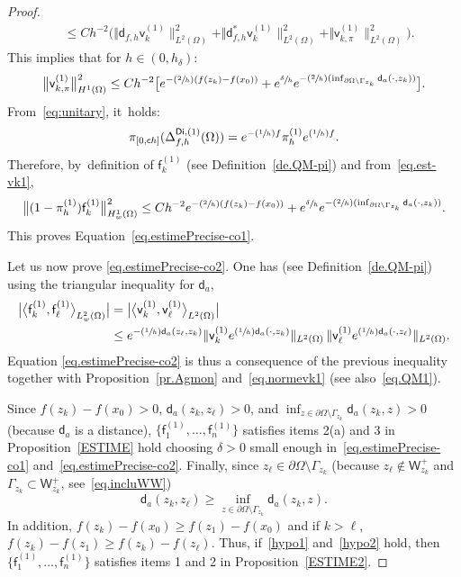 \documentclass[JEP,XML,SOM,Unicode,NoEqCountersInSection,NoFloatCountersInSection,published]{cedram}
\newcommand{\Psfrac}[2]{(\sfrac{#1}{#2})}
\let\lp\langle
\let\rp\rangle
\theoremstyle{plain}
\theoremstyle{definition}
\begin{document}
\begin{proof}
\begin{align}
\label{eq.est-QQ}
& \le Ch^{-2}\bigl(\Vert \mathsf d_{f,h} \mathsf v_k^{(1)} \|_{ L^{2} (\Omega)}^2 + \Vert \mathsf d^*_{f,h} \mathsf v_k^{(1)} \|_{ L^{2} (\Omega)}^2 + \Vert \mathsf v_{k,\pi}^{(1)} \|_{ L^{2} (\Omega)}^2\bigr).
\end{align}
This implies that for $h\in (0,h_\delta)$:
\begin{equation}\label{eq.est-vk1}
\big \| \mathsf v_{k,\pi}^{(1)} \big \|^{2}_{ H^1 (\Omega)}\le C h^{-2} \big[ e^{-\Psfrac 2h(f(z_k)-f(x_0))}+ e^{\sfrac{ \delta }{h}}e^{-\Psfrac 2h(\inf_{ \partial \Omega \setminus \Gamma_{z_k}} \mathsf d_a(\cdot,z_k))}\big].
\end{equation}
From~\eqref{eq:unitary}, it~holds:
\[
\pi_{[0,\mathsf ch]} (\Delta_{f,h}^{\mathsf{Di},(1)} (\Omega))=
e^{-\Psfrac 1hf}\pi_h^{(1)}e^{\Psfrac 1 h f}.
\]
Therefore, by~definition of $ \mathsf f_k^{(1)}$ (see Definition~\ref{de.QM-pi}) and from~\eqref{eq.est-vk1},
\[
\big \Vert (1-\pi_h^{(1)}) \mathsf f_k^{(1)} \big \|^{2}_{ H^{1}_w (\Omega)} \le Ch^{-2}e^{-\Psfrac 2h(f(z_k)-f(x_0))}+ e^{\sfrac{ \delta }{h}} e^{-\Psfrac 2h(\inf_{\partial \Omega \setminus \Gamma_{z_k}} \mathsf d_a(\cdot,z_k))}.
\]
This proves Equation~\eqref{eq.estimePrecise-co1}.

Let us now prove \eqref{eq.estimePrecise-co2}. One has (see Definition~\ref{de.QM-pi}) using the triangular inequality for $\mathsf d_a$,
\[
\begin{aligned}
\bigl\vert \big\lp\mathsf f_k^{(1)}, \mathsf
f_\ell^{(1)}\big\rp_{L^2_w(\Omega)}\bigr|&=\bigl|\big\lp\mathsf v_k^{(1)},
\mathsf v_\ell^{(1)}\big\rp_{L^2(\Omega)}\bigr|\\
&\le e^{-\Psfrac 1h \mathsf d_a(z_\ell,z_k)} \Vert \mathsf
v_k^{(1)}e^{\Psfrac 1h \mathsf d_a(\cdot,z_k)} \Vert_{L^2(\Omega)}\,
\Vert \mathsf v_\ell^{(1)}e^{\Psfrac 1h \mathsf d_a(\cdot,z_\ell)}
\Vert_{L^2(\Omega)}.
\end{aligned}
\]
Equation \eqref{eq.estimePrecise-co2} is thus a consequence of the previous inequality together with Proposition~\ref{pr.Agmon} and~\eqref{eq.normevk1} (see also~\eqref{eq.QM1}).

Since $f(z_k)-f(x_0)>0$, $\mathsf d_a(z_k,z_\ell)>0$, and $ \inf_{z\in \partial \Omega \setminus \Gamma_{z_k}} \mathsf d_a(z_k,z)>0$ (because $\mathsf d_a$ is a distance), $\{\mathsf f_1^{(1)}, \ldots, \mathsf f_n^{(1)}\} $ satisfies items 2(a) and 3 in Proposition~\ref{ESTIME} hold choosing $\delta>0$ small enough in~\eqref{eq.estimePrecise-co1} and~\eqref{eq.estimePrecise-co2}. Finally, since $z_\ell \in \partial \Omega \setminus \Gamma_{z_k}$ (because $z_\ell\notin \mathsf W_{z_k}^+$ and $ \Gamma_{z_k}\subset \mathsf W_{z_k}^+ $, see~\eqref{eq.incluWW})
\[
\mathsf d_a(z_k,z_\ell)\ge \inf_{z\in \partial \Omega \setminus \Gamma_{z_k}} \mathsf d_a(z_k,z).
\]
In addition, $f(z_k)-f(x_0)\!\ge\! f(z_1)-f(x_0)$ and if $k\!>\!\ell$, \hbox{$f(z_k)-f(z_1)\!\ge\! f(z_k)-f(z_\ell)$}.
Thus, if~\eqref{hypo1} and~\eqref{hypo2} hold, then $\{\mathsf f_1^{(1)}, \ldots, \mathsf f_n^{(1)}\} $ satisfies items 1 and 2 in Proposition~\ref{ESTIME2}.
\end{proof}
\end{document}
